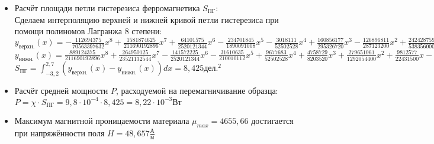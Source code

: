\begin{itemize}
    \item Расчёт площади петли гистерезиса ферромагнетика $S_{\text{ПГ}}$: \\
    Сделаем интерполяцию верхней и нижней кривой петли гистерезиса при помощи полиномов Лагранжа $8$ степени: \\
    $y_{\text{верхн.}}(x) = -\frac{112694375}{70563397632}x^{8}+\frac{1581874625}{211690192896}x^{7}+\frac{64101575}{2520121344}x^{6}-\frac{234701845}{1890091008}x^{5}-\frac{3018111}{52502528}x^{4}+\frac{160856177}{295326720}x^{3}-\frac{126896811}{287123200}x^{2}+\frac{242428759}{538356000}x+\frac{3}{2}$ \\
    $y_{\text{нижн.}}(x) = \frac{889124375}{211690192896}x^{8}+\frac{264950125}{23521132544}x^{7}-\frac{141572225}{2520121344}x^{6}-\frac{31610635}{210010112}x^{5}+\frac{9677683}{52502528}x^{4}+\frac{4758729}{8203520}x^{3}+\frac{279651061}{1292054400}x^{2}+\frac{9812577}{22431500}x-\frac{7}{5}$ \\

    $S_{\text{ПГ}} = \int_{-3,2}^{2,7}(y_{\text{верхн.}}(x) - y_{\text{нижн.}}(x))dx = 8,425 \text{дел.}^2$

    \smallvspace

    \item Расчёт средней мощности $P$, расходуемой на перемагничивание образца: \\
    $P = \chi \cdot S_{\text{ПГ}} = 9,8 \cdot 10^{-4} \cdot 8,425 = 8,22 \cdot 10^{-3} \text{Вт}$

    \smallvspace

    \item Максимум магнитной проницаемости материала $\mu_{max} = 4655,66$ достигается при напряжённости поля $H = 48,657 \frac{\text{А}}{\text{м}}$
    
    
\end{itemize}
